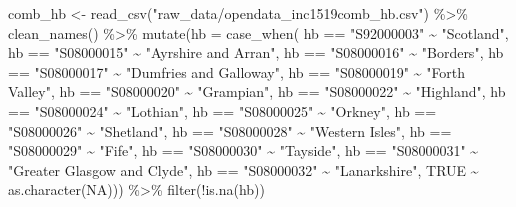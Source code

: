 \documentclass[
]{article}
\newenvironment{Shaded}{\begin{snugshade}}{\end{snugshade}}
\newcommand{\AttributeTok}[1]{\textcolor[rgb]{0.77,0.63,0.00}{#1}}
\newcommand{\ConstantTok}[1]{\textcolor[rgb]{0.00,0.00,0.00}{#1}}
\newcommand{\FunctionTok}[1]{\textcolor[rgb]{0.00,0.00,0.00}{#1}}
\newcommand{\NormalTok}[1]{#1}
\newcommand{\OtherTok}[1]{\textcolor[rgb]{0.56,0.35,0.01}{#1}}
\newcommand{\SpecialCharTok}[1]{\textcolor[rgb]{0.00,0.00,0.00}{#1}}
\newcommand{\StringTok}[1]{\textcolor[rgb]{0.31,0.60,0.02}{#1}}
\begin{document}
\begin{Shaded}
\begin{Highlighting}[]
\NormalTok{comb\_hb }\OtherTok{\textless{}{-}} \FunctionTok{read\_csv}\NormalTok{(}\StringTok{"raw\_data/opendata\_inc1519comb\_hb.csv"}\NormalTok{) }\SpecialCharTok{\%\textgreater{}\%} 
  \FunctionTok{clean\_names}\NormalTok{() }\SpecialCharTok{\%\textgreater{}\%} 
  \FunctionTok{mutate}\NormalTok{(}\AttributeTok{hb =} \FunctionTok{case\_when}\NormalTok{(}
\NormalTok{    hb }\SpecialCharTok{==} \StringTok{"S92000003"} \SpecialCharTok{\textasciitilde{}} \StringTok{"Scotland"}\NormalTok{,}
\NormalTok{    hb }\SpecialCharTok{==} \StringTok{"S08000015"} \SpecialCharTok{\textasciitilde{}} \StringTok{"Ayrshire and Arran"}\NormalTok{,}
\NormalTok{    hb }\SpecialCharTok{==} \StringTok{"S08000016"} \SpecialCharTok{\textasciitilde{}} \StringTok{"Borders"}\NormalTok{,}
\NormalTok{    hb }\SpecialCharTok{==} \StringTok{"S08000017"} \SpecialCharTok{\textasciitilde{}} \StringTok{"Dumfries and Galloway"}\NormalTok{,}
\NormalTok{    hb }\SpecialCharTok{==} \StringTok{"S08000019"} \SpecialCharTok{\textasciitilde{}} \StringTok{"Forth Valley"}\NormalTok{,}
\NormalTok{    hb }\SpecialCharTok{==} \StringTok{"S08000020"} \SpecialCharTok{\textasciitilde{}} \StringTok{"Grampian"}\NormalTok{,}
\NormalTok{    hb }\SpecialCharTok{==} \StringTok{"S08000022"} \SpecialCharTok{\textasciitilde{}} \StringTok{"Highland"}\NormalTok{,}
\NormalTok{    hb }\SpecialCharTok{==} \StringTok{"S08000024"} \SpecialCharTok{\textasciitilde{}} \StringTok{"Lothian"}\NormalTok{,}
\NormalTok{    hb }\SpecialCharTok{==} \StringTok{"S08000025"} \SpecialCharTok{\textasciitilde{}} \StringTok{"Orkney"}\NormalTok{,}
\NormalTok{    hb }\SpecialCharTok{==} \StringTok{"S08000026"} \SpecialCharTok{\textasciitilde{}} \StringTok{"Shetland"}\NormalTok{,}
\NormalTok{    hb }\SpecialCharTok{==} \StringTok{"S08000028"} \SpecialCharTok{\textasciitilde{}} \StringTok{"Western Isles"}\NormalTok{,}
\NormalTok{    hb }\SpecialCharTok{==} \StringTok{"S08000029"} \SpecialCharTok{\textasciitilde{}} \StringTok{"Fife"}\NormalTok{,}
\NormalTok{    hb }\SpecialCharTok{==} \StringTok{"S08000030"} \SpecialCharTok{\textasciitilde{}} \StringTok{"Tayside"}\NormalTok{,}
\NormalTok{    hb }\SpecialCharTok{==} \StringTok{"S08000031"} \SpecialCharTok{\textasciitilde{}} \StringTok{"Greater Glasgow and Clyde"}\NormalTok{,}
\NormalTok{    hb }\SpecialCharTok{==} \StringTok{"S08000032"} \SpecialCharTok{\textasciitilde{}} \StringTok{"Lanarkshire"}\NormalTok{,}
    \ConstantTok{TRUE} \SpecialCharTok{\textasciitilde{}} \FunctionTok{as.character}\NormalTok{(}\ConstantTok{NA}\NormalTok{))) }\SpecialCharTok{\%\textgreater{}\%}
  \FunctionTok{filter}\NormalTok{(}\SpecialCharTok{!}\FunctionTok{is.na}\NormalTok{(hb))}
\end{Highlighting}
\end{Shaded}
\end{document}
